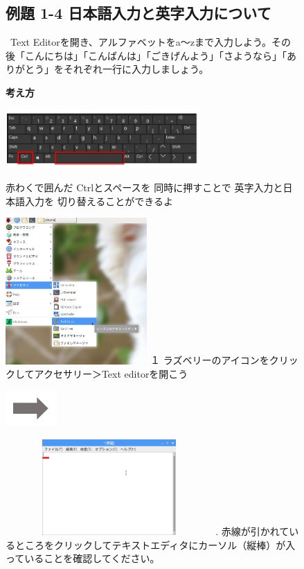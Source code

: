 \documentclass[a4paper,12pt]{jarticle}
\begin{document}
\clearpage
\begin{figure}[ht]
\subsection{例題 1-4
日本語入力と英字入力について}
\ Text
Editorを開き、アルファベットをa〜zまで入力しよう。その後「こんにちは」「こんばんは」「ごきげんよう」「さようなら」「ありがとう」をそれぞれ一行に入力しましょう。

{\bf\large 考え方}


\centering
	\begin{minipage}{\textwidth}
\includegraphics[width=7.459cm,height=2.245cm]{textbook-img065.png}
		\raisebox{10mm}
		{
\begin{minipage}{0.5\textwidth}
赤わくで囲んだ
Ctrlとスペースを
同時に押すことで
英字入力と日本語入力を
切り替えることができるよ
\end{minipage}
}
\end{minipage}

\begin{minipage}{6.984cm}
\includegraphics[width=5.408cm,height=5.595cm]{textbook-img064.png}
\flushleft
１
ラズベリーのアイコンをクリックしてアクセサリー＞Text
editorを開こう
\end{minipage}
\includegraphics[width=1.919cm,height=1.365cm]{textbook-img053.png}
\begin{minipage}{7.347cm}
\includegraphics[width=7.897cm,height=3.655cm]{textbook-img063.png}
.
赤線が引かれているところをクリックしてテキストエディタにカーソル（縦棒）が入っていることを確認してください。
\end{minipage}


\end{figure}
\end{document}
